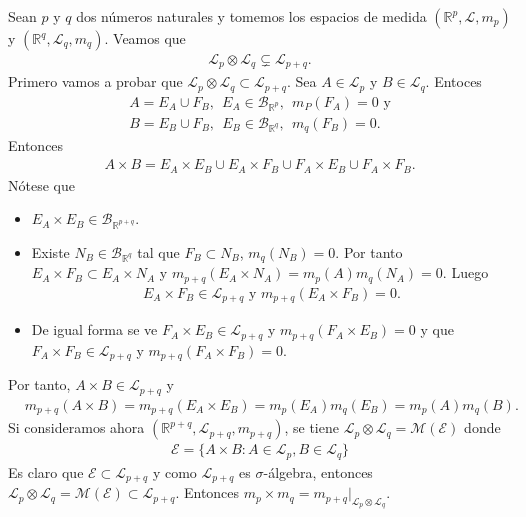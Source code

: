 \begin{obs}
    Sean $p$ y $q$ dos números naturales y tomemos los espacios de medida $(\mathbb{R}^p, \mathcal{L}, m_p)$ y $(\mathbb{R}^q, \mathcal{L}_q, m_q)$. Veamos que
    \begin{align*}
        \mathcal{L}_p \otimes \mathcal{L}_q \subsetneq \mathcal{L}_{p+q}.
    \end{align*}
    Primero vamos a probar que $\mathcal{L}_p \otimes \mathcal{L}_q \subset \mathcal{L}_{p+q}$. Sea $A \in \mathcal{L}_p$ y $B \in \mathcal{L}_q$. Entoces
    \begin{align*}
        A = E_A \cup F_B, \ \ E_A \in \mathcal{B}_{\mathbb{R}^p}, \ \ m_P(F_A) = 0 \text{ y} \\
        B = E_B \cup F_B, \ \ E_B \in \mathcal{B}_{\mathbb{R}^q}, \ \ m_q(F_B) = 0.
    \end{align*}
    Entonces
    \begin{align*}
        A \times B = E_A \times E_B \cup E_A \times F_B \cup F_A \times E_B \cup F_A \times F_B.
    \end{align*}
    Nótese que
    \begin{itemize}
        \item $E_A \times E_B \in \mathcal{B}_{\mathbb{R}^{p+q}}$.
        \item Existe $N_B \in \mathcal{B}_{\mathbb{R}^{q}}$ tal que $F_B \subset N_B$, $m_q(N_B) = 0$. Por tanto $E_A \times F_B \subset E_A \times N_A$ y $m_{p+q}(E_A \times N_A) = m_p(A)m_q(N_A) = 0$. Luego
              \begin{align*}
                  E_A \times F_B \in \mathcal{L}_{p +q} \text{ y } m_{p+q}(E_A \times F_B) = 0.
              \end{align*}
        \item De igual forma se ve $F_A \times E_B \in \mathcal{L}_{p +q}$ y $m_{p+q}(F_A \times E_B) = 0$ y que $F_A \times F_B \in \mathcal{L}_{p+q}$ y $m_{p+q}(F_A \times F_B) = 0$.
    \end{itemize}
    Por tanto, $A \times B \in \mathcal{L}_{p+q}$ y
    \begin{align*}
         & m_{p+q}(A \times B) = m_{p+q}(E_A \times E_B) = m_p(E_A)m_q(E_B) = m_p(A)m_q(B).
    \end{align*}
    Si consideramos ahora $(\mathbb{R}^{p+q}, \mathcal{L}_{p+q}, m_{p+q})$, se tiene $\mathcal{L}_p \otimes \mathcal{L}_q = \mathcal{M}(\mathcal{E})$ donde
    \begin{align*}
        \mathcal{E} = \{ A \times B : A \in \mathcal{L}_p, B \in \mathcal{L}_q \}
    \end{align*}
    Es claro que $\mathcal{E} \subset \mathcal{L}_{p+q}$ y como $\mathcal{L}_{p+q}$ es $\sigma$-álgebra, entonces $\mathcal{L}_p \otimes \mathcal{L}_q = \mathcal{M}(\mathcal{E}) \subset \mathcal{L}_{p+q}$. Entonces $m_p \times m_q = m_{p+q}|_{\mathcal{L}_p \otimes \mathcal{L}_q}$.


\end{obs}
